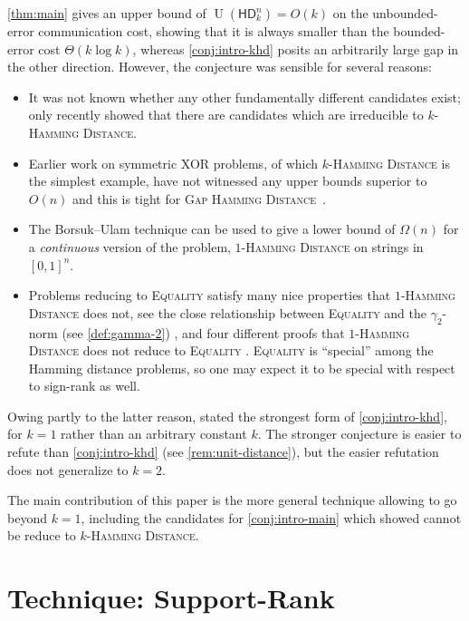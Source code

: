 \documentclass{article}
\DeclareMathOperator{\U}{U}
\newcommand{\HD}[1]{\mathsf{HD}_{#1}}
\begin{document}
\cref{thm:main} 
gives an upper bound of $\U(\HD{k}^n) = O(k)$ on the unbounded-error
communication cost, showing that it is always smaller than the bounded-error
cost $\Theta(k \log k)$, whereas \cref{conj:intro-khd} posits an arbitrarily
large gap in the other direction. However, the conjecture was sensible for
several reasons:
\begin{itemize}[itemsep=0pt]
  \item It was not known whether any other fundamentally different candidates exist; \cite{FGHH25} only recently showed that there are candidates which are irreducible to \textsc{$k$-Hamming Distance}.
  \item Earlier work on symmetric XOR problems, of which
\textsc{$k$-Hamming Distance} is the simplest example, have not witnessed any upper bounds
superior to $O(n)$ \cite{HQ17} and this is tight for \textsc{Gap Hamming Distance}~\cite{HHM23}.
  \item The Borsuk--Ulam technique can be used to give a lower bound of $\Omega(n)$ for a \emph{continuous} version of the problem, \textsc{$1$-Hamming Distance} on strings in $[0,1]^n$.
  \item Problems reducing to \textsc{Equality} 
  satisfy many nice properties that \textsc{$1$-Hamming Distance} does not, see \eg
  the close relationship between \textsc{Equality} and the $\gamma_2$-norm (see
  \cref{def:gamma-2}) \cite{HHH22,CHHS23,PSS23,CHZZ24,CHHNPS25,Tom25}, and four different
  proofs that \textsc{$1$-Hamming Distance} does not reduce to \textsc{Equality}
  \cite{HHH22,HWZ22,FHHH24,HR24}. \textsc{Equality} is
  ``special'' among the Hamming distance problems, so one may expect it to be
  special with respect to sign-rank as well.
\end{itemize}
Owing partly to the latter reason, \cite{HHPTZ22,HHM23,HZ24} stated the strongest form of
\cref{conj:intro-khd}, for $k=1$ rather than an arbitrary constant $k$. The stronger conjecture is
easier to refute than \cref{conj:intro-khd} (see \cref{rem:unit-distance}), but the easier
refutation does not generalize to $k=2$.

The main contribution of this paper is the more general technique allowing to go
beyond $k=1$, including the candidates for \cref{conj:intro-main} which
\cite{FGHH25} showed cannot be reduce to \textsc{$k$-Hamming Distance}. 

\section{Technique: Support-Rank}
\label{sec:techniques}
\end{document}
